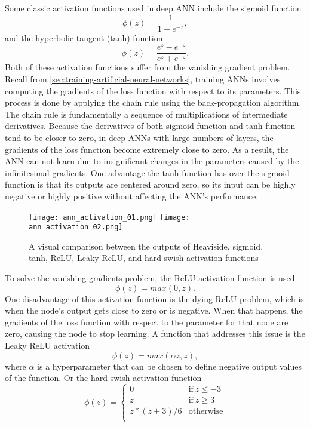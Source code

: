 Some classic activation functions used in deep \gls{ANN} include the sigmoid function
\begin{equation*}
    \phi(z) = \frac{1}{1 + e^{-z}},
\end{equation*}
and the hyperbolic tangent (tanh) function
\begin{equation*}
    \phi(z) = \frac{e^z - e^{-z}}{e^z + e^{-z}}.
\end{equation*}
Both of these activation functions suffer from the vanishing gradient problem.
Recall from \autoref{sec:training-artificial-neural-networks}, training \glspl{ANN} involves computing the gradients of the loss function with respect to its parameters.
This process is done by applying the chain rule using the back-propagation algorithm.
The chain rule is fundamentally a sequence of multiplications of intermediate derivatives.
Because the derivatives of both sigmoid function and tanh function tend to be closer to zero, in deep \glspl{ANN} with large numbers of layers, the gradients of the loss function become extremely close to zero.
As a result, the \gls{ANN} can not learn due to insignificant changes in the parameters caused by the infinitesimal gradients.
One advantage the tanh function has over the sigmoid function is that its outputs are centered around zero, so its input can be highly negative or highly positive without affecting the \gls{ANN}'s performance.

\begin{figure}[h]
    \centering
    \texttt{[image: ann\_activation\_01.png]}
    \texttt{[image: ann\_activation\_02.png]}
    \caption{A visual comparison between the outputs of Heaviside, sigmoid, tanh, \gls{ReLU}, Leaky ReLU, and hard swish activation functions}
    \label{fig:heaviside-sigmoid-tanh}
\end{figure}

To solve the vanishing gradients problem, the \gls{ReLU} activation function is used
\begin{equation*}
    \phi(z) = max(0, z).
\end{equation*}
One disadvantage of this activation function is the dying \gls{ReLU} problem, which is when the node's output gets close to zero or is negative.
When that happens, the gradients of the loss function with respect to the parameter for that node are zero, causing the node to stop learning.
A function that addresses this issue is the Leaky \gls{ReLU} activation
\begin{equation*}
    \phi(z) = max(\alpha z, z),
\end{equation*}
where $\alpha$ is a hyperparameter that can be chosen to define negative output values of the function.
Or the hard swish activation function \cite{howardSearchingMobileNetV32019}
\begin{equation*}
\phi(z)=\begin{cases}
    0 & \text{if}\ z \leq -3 \\
    z & \text{if}\ z \geq 3 \\
    z * (z + 3) / 6 & \text{otherwise}  \\
\end{cases}
\end{equation*}